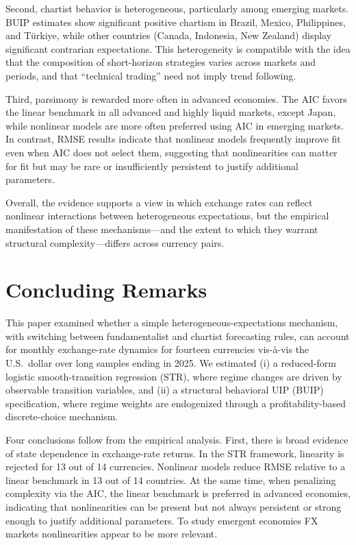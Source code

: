 \documentclass[a4paper,10pt,final]{article}    %
\begin{document}
Second, chartist behavior is heterogeneous, particularly among emerging markets. BUIP estimates show significant positive chartism in Brazil, Mexico, Philippines, and Türkiye, while other countries (Canada, Indonesia, New Zealand) display significant contrarian expectations. This heterogeneity is compatible with the idea that the composition of short-horizon strategies varies across markets and periods, and that ``technical trading'' need not imply trend following.

Third, parsimony is rewarded more often in advanced economies. The AIC favors the linear benchmark in all advanced and highly liquid markets, except Japan, while nonlinear models are more often preferred using AIC in emerging markets. In contrast, RMSE results indicate that nonlinear models frequently improve fit even when AIC does not select them, suggesting that nonlinearities can matter for fit but may be rare or insufficiently persistent to justify additional parameters.

Overall, the evidence supports a view in which exchange rates can reflect nonlinear interactions between heterogeneous expectations, but the empirical manifestation of these mechanisms---and the extent to which they warrant structural complexity---differs across currency pairs.



\section{Concluding Remarks}
\label{chap:conclusions}

This paper examined whether a simple heterogeneous-expectations mechanism, with switching between fundamentalist and chartist forecasting rules, can account for monthly exchange-rate dynamics for fourteen currencies vis-\`a-vis the U.S.\ dollar over long samples ending in 2025. We estimated (i) a reduced-form logistic smooth-transition regression (STR), where regime changes are driven by observable transition variables, and (ii) a structural behavioral UIP (BUIP) specification, where regime weights are endogenized through a profitability-based discrete-choice mechanism.

Four conclusions follow from the empirical analysis. First, there is broad evidence of state dependence in exchange-rate returns. In the STR framework, linearity is rejected for 13 out of 14 currencies. Nonlinear models reduce RMSE relative to a linear benchmark in 13 out of 14 countries. At the same time, when penalizing complexity via the AIC, the linear benchmark is preferred in advanced economies, indicating that nonlinearities can be present but not always persistent or strong enough to justify additional parameters. To study emergent economies FX markets nonlinearities appear to be more relevant.
\end{document}
